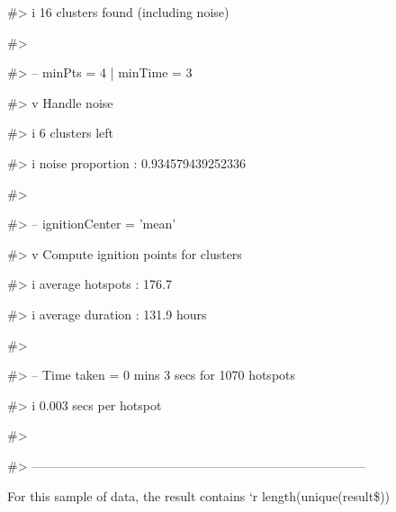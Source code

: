 \begin{Schunk}
\begin{Soutput}
#> i 16 clusters found (including noise)
\end{Soutput}
\begin{Soutput}
#> 
\end{Soutput}
\begin{Soutput}
#> -- minPts = 4 | minTime = 3
\end{Soutput}
\begin{Soutput}
#> v Handle noise
\end{Soutput}
\begin{Soutput}
#> i 6 clusters left
\end{Soutput}
\begin{Soutput}
#> i noise proportion : 0.934579439252336 %
\end{Soutput}
\begin{Soutput}
#> 
\end{Soutput}
\begin{Soutput}
#> -- ignitionCenter = 'mean'
\end{Soutput}
\begin{Soutput}
#> v Compute ignition points for clusters
\end{Soutput}
\begin{Soutput}
#> i average hotspots : 176.7
\end{Soutput}
\begin{Soutput}
#> i average duration : 131.9 hours
\end{Soutput}
\begin{Soutput}
#> 
\end{Soutput}
\begin{Soutput}
#> -- Time taken = 0 mins 3 secs for 1070 hotspots
\end{Soutput}
\begin{Soutput}
#> i 0.003 secs per hotspot
\end{Soutput}
\begin{Soutput}
#> 
\end{Soutput}
\begin{Soutput}
#> --------------------------------------------------------------------------------
\end{Soutput}
\end{Schunk}

For this sample of data, the result contains `r length(unique(result\$))

